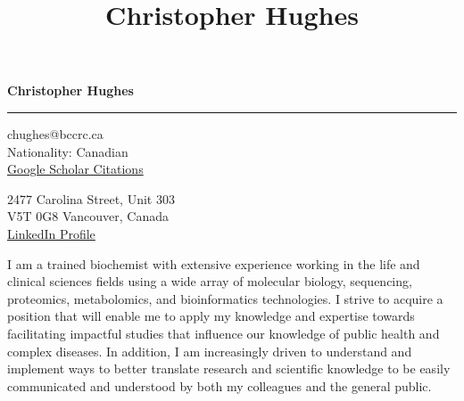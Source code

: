 \documentclass[11pt]{article}
\title{\bfseries\Huge Christopher Hughes}
\author{}
\date{}
\begin{document}
	\newpage
	\setcounter{page}{1}
	\noindent

\begin{LARGE}

	\noindent\textbf{Christopher Hughes}\vspace{1pt}

\end{LARGE}


\noindent\rule{\textwidth}{1pt}\vspace{9pt}

\noindent
\begin{minipage}{0.5\textwidth}
	\begin{flushleft}
		chughes@bccrc.ca\\
		Nationality: Canadian\\ \href{https://scholar.google.com/citations?user=jPSwBGwAAAAJ}{Google Scholar Citations}
	\end{flushleft}
\end{minipage}%
\begin{minipage}{0.5\textwidth}
	\begin{flushright}
		2477 Carolina Street, Unit 303\\
		V5T 0G8 Vancouver, Canada\\ \href{https://www.linkedin.com/in/christopher-hughes-612460133/}{LinkedIn Profile}
	\end{flushright}
\end{minipage}\vspace{18pt}


I am a trained biochemist with extensive experience working in the life and clinical sciences fields using a wide array of molecular biology, sequencing, proteomics, metabolomics, and bioinformatics technologies. I strive to acquire a position that will enable me to apply my knowledge and expertise towards facilitating impactful studies that influence our knowledge of public health and complex diseases. In addition, I am increasingly driven to understand and implement ways to better translate research and scientific knowledge to be easily communicated and understood by both my colleagues and the general public.\\ 
\end{document}
